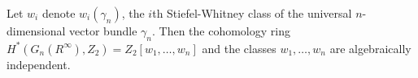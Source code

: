 Let $w_i$ denote $w_i(\gamma_n)$, the $i$th Stiefel-Whitney class of the universal $n$-dimensional vector bundle $\gamma_n$. Then the cohomology ring $H^*(G_n(R^\infty), Z_2) = Z_2[w_1, \ldots, w_n]$ and the classes $w_1, \ldots, w_n$ are algebraically independent.
